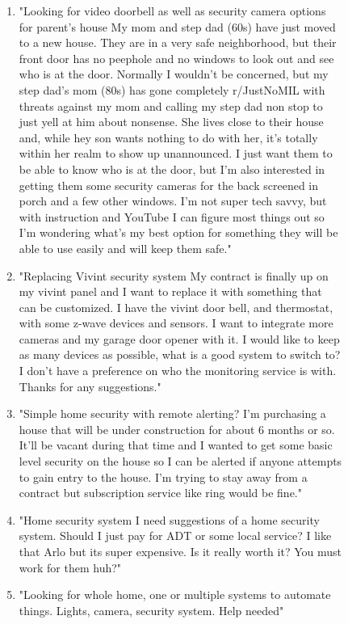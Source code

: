 \documentclass{article}
\begin{document}
    \begin{figure}[H]
        \begin{footnotesize}
        \begin{enumerate}
            \item "Looking for video doorbell as well as security camera options for parent's house My mom and step dad (60s) have just moved to a new house. They are in a very safe neighborhood, but their front door has no peephole and no windows to look out and see who is at the door. Normally I wouldn't be concerned, but my step dad's mom (80s) has gone completely r/JustNoMIL with threats against my mom and calling my step dad non stop to just yell at him about nonsense. She lives close to their house and, while hey son wants nothing to do with her, it's totally within her realm to show up unannounced. I just want them to be able to know who is at the door, but I'm also interested in getting them some security cameras for the back screened in porch and a few other windows. I'm not super tech savvy, but with instruction and YouTube I can figure most things out so I'm wondering what's my best option for something they will be able to use easily and will keep them safe."
            \item "Replacing Vivint security system My contract is finally up on my vivint panel and I want to replace it with something that can be customized. I have the vivint door bell, and thermostat, with some z-wave devices and sensors. I want to integrate more cameras and my garage door opener with it. I would like to keep as many devices as possible, what is a good system to switch to? I don't have a preference on who the monitoring service is with. Thanks for any suggestions."
            \item "Simple home security with remote alerting? I’m purchasing a house that will be under construction for about 6 months or so. It’ll be vacant during that time and I wanted to get some basic level security on the house so I can be alerted if anyone attempts to gain entry to the house. I’m trying to stay away from a contract but subscription service like ring would be fine."
            \item "Home security system I need suggestions of a home security system. Should I just pay for ADT or some local service?  I like that Arlo but its super expensive. Is it really worth it?  You must work for them huh?"
            \item "Looking for whole home, one or multiple systems to automate things. Lights, camera, security system. Help needed"

\end{enumerate}
\end{footnotesize}
\end{figure}
\end{document}
